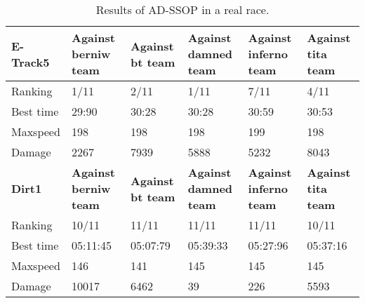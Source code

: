 \documentclass[runningheads,a4paper]{llncs}
\begin{document}
	\begin{table}[ht!]
		\caption{Results of AD-SSOP in a real race.}
		\label{resultat31}
		{\scriptsize
			\begin{tabular}{ |p{2cm}|p{2cm}|p{2cm}|p{2 cm}|p{2 cm}|p{2 cm}|}
				\hline
				{ \color{blue}\textbf{E-Track5} }&
				{ \color{red}\textbf{Against berniw team }}&  
				{ \color{red} \textbf{Against bt team} } &
				{ \color{red} \textbf{Against damned team} } &
				{ \color{red} \textbf{Against inferno team} }&
				{ \color{red} \textbf{Against tita team} }
				\\
				\hline
				Ranking & 1/11 & 2/11   & 1/11 & 7/11& 4/11
				\\
				\hline
				Best time & 29:90 & 30:28   & 30:28 & 30:59& 30:53 
				\\
				\hline 
				Maxspeed & 198 & 198 &  198 & 199 & 198
				\\
				\hline
				
				Damage & 2267 & 7939 &  5888 & 5232& 8043
				\\
				\hline 
				\hline
				{ \color{blue}\textbf{Dirt1} }&
				{ \color{red}\textbf{Against berniw team }}&  
				{ \color{red} \textbf{Against bt team} } &
				{ \color{red} \textbf{Against damned team} } &
				{ \color{red} \textbf{Against inferno team} }&
				{ \color{red} \textbf{Against tita team} }
				\\
				\hline
				Ranking & 10/11 & 11/11 & 11/11 & 11/11 & 10/11
				\\
				\hline
				Best time& 05:11:45 & 05:07:79 & 05:39:33 & 05:27:96   & 05:37:16
				\\
				\hline 
				Maxspeed & 146 & 141 & 145 & 145 & 145\\
				\hline		
				Damage & 10017 & 6462 & 39 & 226& 5593\\
				
				\hline
				\hline
				

\end{tabular}}
\end{table}
\end{document}
